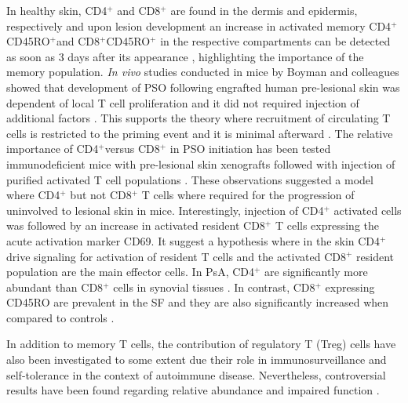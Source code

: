 In healthy skin, CD4$^{+}$ and CD8$^{+}$ are found in the dermis and epidermis, respectively \parencite{Clark2006,Perera2012} and upon lesion development an increase in activated memory CD4$^{+}$CD45RO$^{+}$and CD8$^{+}$CD45RO$^{+}$ in the respective compartments can be detected as soon as 3 days after its appearance \parencite{Clark2006}, highlighting the importance of the memory population. \textit{In vivo} studies conducted in mice by Boyman and colleagues showed that development of PSO following engrafted human pre-lesional skin was dependent of local T cell proliferation and it did not required injection of additional factors \parencite{Boyle2013}. This supports the theory where recruitment of circulating T cells is restricted to the priming event and it is minimal afterward \parencite{Perera2012}. The relative importance of CD4$^{+}$versus CD8$^{+}$ in PSO initiation has been tested immunodeficient mice with pre-lesional skin xenografts followed with injection of purified activated T cell populations \parencite{Nickoloff1999}. These observations suggested a model where CD4$^{+}$ but not CD8$^{+}$ T cells where required for the progression of uninvolved to lesional skin in mice. Interestingly, injection of CD4$^{+}$ activated cells was followed by an increase in activated resident CD8$^{+}$ T cells expressing the acute activation marker CD69. It suggest a hypothesis where in the skin CD4$^{+}$ drive signaling for activation of resident T cells and the activated CD8$^{+}$ resident population are the main effector cells. In PsA, CD4$^{+}$ are significantly more abundant than CD8$^{+}$ cells in synovial tissues \parencite{Diani2015}. In contrast, CD8$^{+}$ expressing CD45RO are prevalent in the SF and they are also significantly increased when compared to controls \parencite{Costello1999}.

In addition to memory T cells, the contribution of regulatory T (Treg) cells have also been investigated to some extent due their role in immunosurveillance and self-tolerance in the context of autoimmune disease. Nevertheless, controversial results have been found regarding relative abundance and impaired function \parencite{Perera2012}. 

